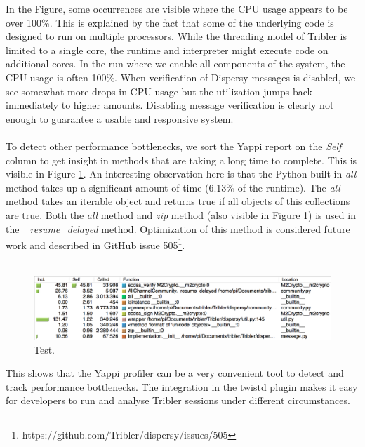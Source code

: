 In the Figure, some occurrences are visible where the CPU usage appears to be over 100\%. This is explained by the fact that some of the underlying code is designed to run on multiple processors. While the threading model of Tribler is limited to a single core, the runtime and interpreter might execute code on additional cores. In the run where we enable all components of the system, the CPU usage is often 100\%. When verification of Dispersy messages is disabled, we see somewhat more drops in CPU usage but the utilization jumps back immediately to higher amounts. Disabling message verification is clearly not enough to guarantee a usable and responsive system.\\\\
To detect other performance bottlenecks, we sort the Yappi report on the \emph{Self} column to get insight in methods that are taking a long time to complete. This is visible in Figure \ref{fig:yappi_breakdown_self}. An interesting observation here is that the Python built-in \emph{all} method takes up a significant amount of time (6.13\% of the runtime). The \emph{all} method takes an iterable object and returns true if all objects of this collections are true. Both the \emph{all} method and \emph{zip} method (also visible in Figure \ref{fig:yappi_breakdown_self}) is used in the \emph{\_resume\_delayed} method. Optimization of this method is considered future work and described in GitHub issue 505\footnote{https://github.com/Tribler/dispersy/issues/505}.\\\\

\begin{figure}[!h]
	\centering
	\includegraphics[width=0.9\columnwidth]{images/experiments/yappi_breakdown_self}
	\caption{Test.}
	\label{fig:yappi_breakdown_self}
\end{figure}

This shows that the Yappi profiler can be a very convenient tool to detect and track performance bottlenecks. The integration in the twistd plugin makes it easy for developers to run and analyse Tribler sessions under different circumstances.